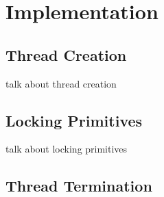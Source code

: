 \chapter{Implementation}\label{thesis_methodology}


\section{Thread Creation}\label{sec_threadcreation}
talk about thread creation

\section{Locking Primitives}\label{sec_lockingprimitives}
talk about locking primitives

\section{Thread Termination}\label{sec_threadtermination}
